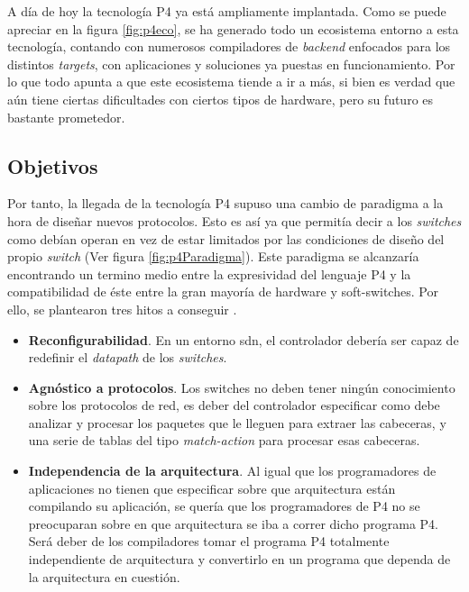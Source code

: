 A día de hoy la tecnología P4 ya está ampliamente implantada. Como se puede apreciar en la figura \ref{fig:p4eco}, se ha generado todo un ecosistema entorno a esta tecnología, contando con numerosos compiladores de \textit{backend} enfocados para los distintos \textit{targets}, con aplicaciones y soluciones ya puestas en funcionamiento. Por lo que todo apunta a que este ecosistema tiende a ir a más, si bien es verdad que aún tiene ciertas dificultades con ciertos tipos de hardware, pero su futuro es bastante prometedor. 


\subsection{Objetivos}

Por tanto, la llegada de la tecnología P4 supuso una cambio de paradigma a la hora de diseñar nuevos protocolos. Esto es así ya que permitía decir a los \textit{switches} como debían operan en vez de estar limitados por las condiciones de diseño del propio \textit{switch} (Ver figura \ref{fig:p4Paradigma}). Este paradigma se alcanzaría encontrando un termino medio entre la expresividad del lenguaje P4 y la compatibilidad de éste entre la gran mayoría de hardware y soft-switches. Por ello, se plantearon tres hitos a conseguir \cite{2014p4}.

\begin{itemize}
    \item \textbf{Reconfigurabilidad}. En un entorno \gls{sdn}, el controlador debería ser capaz de redefinir el \textit{datapath} de los \textit{switches}.
    \item \textbf{Agnóstico a protocolos}. Los switches no deben tener ningún conocimiento sobre los protocolos de red, es deber del controlador especificar como debe analizar y procesar los paquetes que le lleguen para extraer las cabeceras, y una serie de tablas del tipo \textit{match-action} para procesar esas cabeceras. 
    \item \textbf{Independencia de la arquitectura}. Al igual que los programadores de aplicaciones no tienen que especificar sobre que arquitectura están compilando su aplicación, se quería que los programadores de P4 no se preocuparan sobre en que arquitectura se iba a correr dicho programa P4. Será deber de los compiladores tomar el programa P4 totalmente independiente de arquitectura y convertirlo en un programa que dependa de la arquitectura en cuestión.
\end{itemize}

